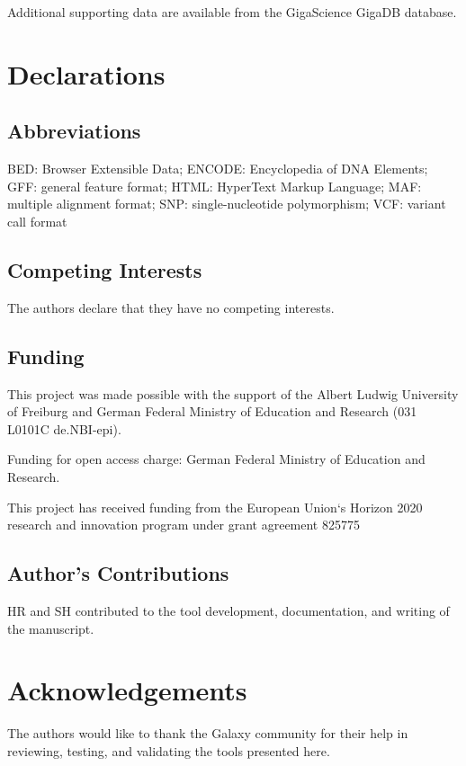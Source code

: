 Additional supporting data are available from the GigaScience GigaDB database.

\section*{Declarations}

\subsection*{Abbreviations}

BED: Browser Extensible Data; ENCODE: Encyclopedia of DNA Elements; GFF: general feature format; HTML: HyperText Markup Language; MAF: multiple alignment format; SNP: single-nucleotide polymorphism; VCF: variant call format

\subsection*{Competing Interests}
The authors declare that they have no competing interests.

\subsection*{Funding}
This project was made possible with the support of the Albert Ludwig University of Freiburg and German Federal Ministry of Education and Research (031 L0101C de.NBI-epi).

Funding for open access charge: German Federal Ministry of Education and Research.

This project has received funding from the European Union`s Horizon 2020 research and innovation program under grant agreement 825775

\subsection*{Author's Contributions}

HR and SH contributed to the tool development, documentation, and writing of the manuscript.

\section*{Acknowledgements}

The authors would like to thank the Galaxy community for their help in reviewing, testing, and validating the tools presented here.

\footnotesize


\normalsize
